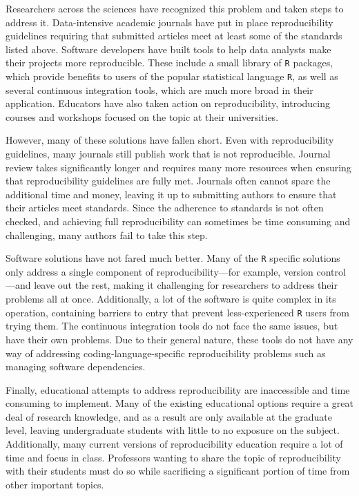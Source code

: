 \documentclass[12pt,twoside]{reedthesis}
\begin{document}
Researchers across the sciences have recognized this problem and taken steps to address it. Data-intensive academic journals have put in place reproducibility guidelines requiring that submitted articles meet at least some of the standards listed above. Software developers have built tools to help data analysts make their projects more reproducible. These include a small library of \texttt{R} packages, which provide benefits to users of the popular statistical language \texttt{R}, as well as several continuous integration tools, which are much more broad in their application. Educators have also taken action on reproducibility, introducing courses and workshops focused on the topic at their universities.

However, many of these solutions have fallen short. Even with reproducibility guidelines, many journals still publish work that is not reproducible. Journal review takes significantly longer and requires many more resources when ensuring that reproducibility guidelines are fully met. Journals often cannot spare the additional time and money, leaving it up to submitting authors to ensure that their articles meet standards. Since the adherence to standards is not often checked, and achieving full reproducibility can sometimes be time consuming and challenging, many authors fail to take this step.

Software solutions have not fared much better. Many of the \texttt{R} specific solutions only address a single component of reproducibility---for example, version control---and leave out the rest, making it challenging for researchers to address their problems all at once. Additionally, a lot of the software is quite complex in its operation, containing barriers to entry that prevent less-experienced \texttt{R} users from trying them. The continuous integration tools do not face the same issues, but have their own problems. Due to their general nature, these tools do not have any way of addressing coding-language-specific reproducibility problems such as managing software dependencies.

Finally, educational attempts to address reproducibility are inaccessible and time consuming to implement. Many of the existing educational options require a great deal of research knowledge, and as a result are only available at the graduate level, leaving undergraduate students with little to no exposure on the subject. Additionally, many current versions of reproducibility education require a lot of time and focus in class. Professors wanting to share the topic of reproducibility with their students must do so while sacrificing a significant portion of time from other important topics.
\end{document}
